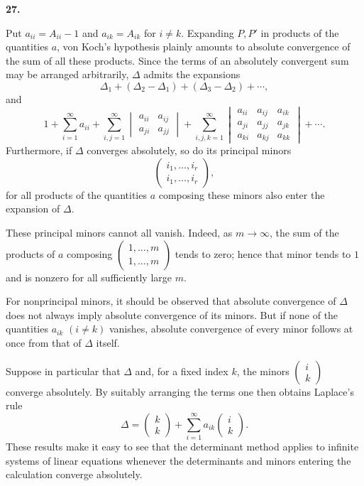 \documentclass[
  paper=b5,
  fontsize=13pt,
  twoside=true,
  open=any,
  bookmarkpackage=false,
  chapterprefix=true,
  headings=normal
]{scrbook}
\theoremstyle{definition}
\newcommand{\numberedparagraph}[1]{%
  \par\medskip\phantomsection\label{sec:#1}%
  \noindent\textbf{#1.}\enspace
}
\begin{document}
\numberedparagraph{27}
Put $a_{ii}=A_{ii}-1$ and $a_{ik}=A_{ik}$ for $i\ne k$. Expanding $P,P'$ in products of the quantities $a$, von Koch's hypothesis plainly amounts to absolute convergence of the sum of all these products. Since the terms
of an absolutely convergent sum may be arranged arbitrarily, $\Delta$ admits the expansions
\[
 \Delta_1+(\Delta_2-\Delta_1)+(\Delta_3-\Delta_2)+\cdots,
\]
and
\[
 1+\sum_{i=1}^{\infty}a_{ii}
 +\sum_{i,j=1}^{\infty}
 \begin{vmatrix}a_{ii}&a_{ij}\\a_{ji}&a_{jj}\end{vmatrix}
 +\sum_{i,j,k=1}^{\infty}
 \begin{vmatrix}
 a_{ii}&a_{ij}&a_{ik}\\
 a_{ji}&a_{jj}&a_{jk}\\
 a_{ki}&a_{kj}&a_{kk}
 \end{vmatrix}+\cdots.
\]
Furthermore, if $\Delta$ converges absolutely, so do its principal minors
\[
 \left(\begin{matrix}i_1,\ldots,i_r\\i_1,\ldots,i_r\end{matrix}\right),
\]
for all products of the quantities $a$ composing these minors also enter the expansion of $\Delta$.

These principal minors cannot all vanish. Indeed, as $m\to\infty$, the sum of the products of $a$ composing
$\left(\begin{smallmatrix}1,\ldots,m\\1,\ldots,m\end{smallmatrix}\right)$ tends to zero; hence that minor tends to $1$ and is nonzero for all sufficiently large $m$.

For nonprincipal minors, it should be observed that absolute convergence of $\Delta$ does not always imply absolute convergence of its minors. But if none of the quantities $a_{ik}$ $(i\ne k)$ vanishes, absolute convergence of every minor follows at once from that of $\Delta$ itself.

Suppose in particular that $\Delta$ and, for a fixed index $k$, the minors $\left(\begin{smallmatrix}i\\k\end{smallmatrix}\right)$ converge absolutely. By suitably arranging the terms one then obtains Laplace's rule
\[
 \Delta=\left(\begin{matrix}k\\k\end{matrix}\right)
 +\sum_{i=1}^{\infty}a_{ik}
  \left(\begin{matrix}i\\k\end{matrix}\right).
\]
These results make it easy to see that the determinant method applies to infinite systems of linear equations whenever the determinants and minors entering the calculation converge absolutely.
\end{document}

